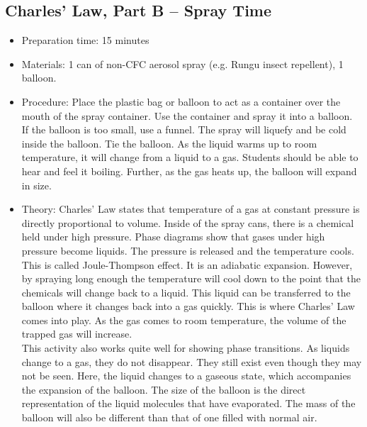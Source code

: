 \subsection{Charles' Law, Part B -- Spray Time}
\begin{itemize}
\item{Preparation time: 15 minutes}
\item{Materials: 1 can of non-CFC aerosol spray (e.g. Rungu insect repellent), 1 balloon.}
\item{Procedure: Place the plastic bag or balloon to act as a container over the mouth of the spray container. Use the container and spray it into a balloon. If the balloon is too small, use a funnel. The spray will liquefy and be cold inside the balloon. Tie the balloon. As the liquid warms up to room temperature, it will change from a liquid to a gas. Students should be able to hear and feel it boiling. Further, as the gas heats up, the balloon will expand in size.}
\item{Theory: Charles' Law states that temperature of a gas at constant pressure is directly proportional to volume. Inside of the spray cans, there is a chemical held under high pressure. Phase diagrams show that gases under high pressure become liquids. The pressure is released and the temperature cools. This is called Joule-Thompson effect. It is an adiabatic expansion. However, by spraying long enough the temperature will cool down to the point that the chemicals will change back to a liquid. This liquid can be transferred to the balloon where it changes back into a gas quickly. This is where Charles' Law comes into play. As the gas comes to room temperature, the volume of the trapped gas will increase.\\
This activity also works quite well for showing phase transitions. As liquids change to a gas, they do not disappear. They still exist even though they may not be seen. Here, the liquid changes to a gaseous state, which accompanies the expansion of the balloon. The size of the balloon is the direct representation of the liquid molecules that have evaporated. The mass of the balloon will also be different than that of one filled with normal air.}
\end{itemize}

